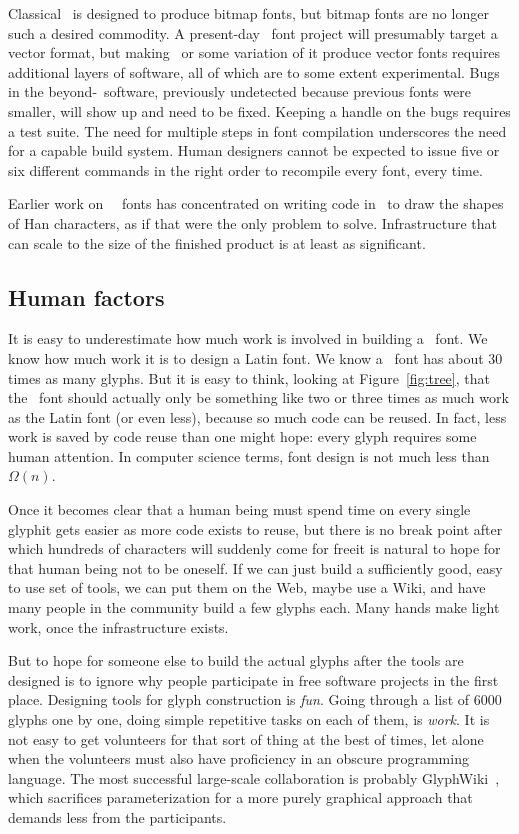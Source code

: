 \documentclass{ltugboat}
\begin{document}
Classical \MF\ is designed to produce bitmap fonts, but bitmap fonts are no
longer such a desired commodity.  A present-day \CJK\ font project will
presumably target a vector format, but making \MF\ or some variation of it
produce vector fonts requires additional layers of software, all of which
are to some extent experimental.  Bugs in the beyond-\MF\ software,
previously undetected because previous fonts were smaller, will show up and
need to be fixed.  Keeping a handle on the bugs requires a test suite.  The
need for multiple steps in font compilation underscores the need for a
capable build system.  Human designers cannot be expected to issue five or
six different commands in the right order to recompile every font, every time.

Earlier work on \MF\ \CJK\ fonts has concentrated on writing code in \MF\ to
draw the shapes of Han characters, as if that were the only problem to solve. 
Infrastructure that can scale to the size of the finished product is at
least as significant.

\subsection{Human factors}

It is easy to underestimate how much work is involved in building a \CJK\
font.  We know how much work it is to design a Latin font.  We know a \CJK\
font has about 30 times as many glyphs.  But it is easy to think, looking at
Figure~\ref{fig:tree}, that the \CJK\ font should actually only be something
like two or three times as much work as the Latin font (or even less),
because so much code can be reused.  In fact, less work is saved by code
reuse than one might hope: every glyph requires some human attention.  In
computer science terms, font design is not much less than $\Omega(n)$.

Once it becomes clear that a human being must spend time on every single
glyph\Dash it gets easier as more code exists to reuse, but there is no
break point after which hundreds of characters will suddenly come for
free\Dash it is natural to hope for that human being not to be oneself.  If
we can just build a sufficiently good, easy to use set of tools, we can put
them on the Web, maybe use a Wiki, and have many people in the community
build a few glyphs each.  Many hands make light work, once the
infrastructure exists.

But to hope for someone else to build the actual glyphs after the tools are
designed is to ignore why people participate in free software projects in
the first place.  Designing tools for glyph construction is \emph{fun}. 
Going through a list of 6000 glyphs one by one, doing simple repetitive
tasks on each of them, is \emph{work}.  It is not easy to get volunteers for
that sort of thing at the best of times, let alone when the volunteers must
also have proficiency in an obscure programming language.  The most
successful large-scale collaboration is probably
GlyphWiki~\cite{Kamichi:GlyphWiki}, which sacrifices parameterization for a
more purely graphical approach that demands less from the participants.
\end{document}

